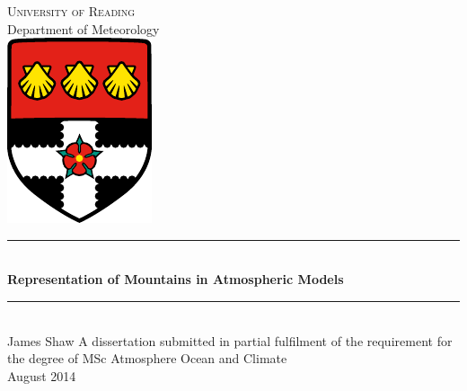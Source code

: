\begin{titlepage}
\begin{center}
\textsc{\Large University of Reading} \\[12pt]
{\Large Department of Meteorology} \\[12pt]
\includegraphics{uor-logo} \\[48pt]

\rule{\textwidth}{.4pt} \\[12pt]
{ \huge \bfseries Representation of Mountains in Atmospheric Models \\[12pt] } \rule{\textwidth}{.4pt} \\[54pt]
{\LARGE James Shaw}
\vfill
A dissertation submitted in partial fulfilment of the requirement for the degree of MSc Atmosphere Ocean and Climate \\[48pt]
{\Large August 2014}
\end{center}
\end{titlepage}

